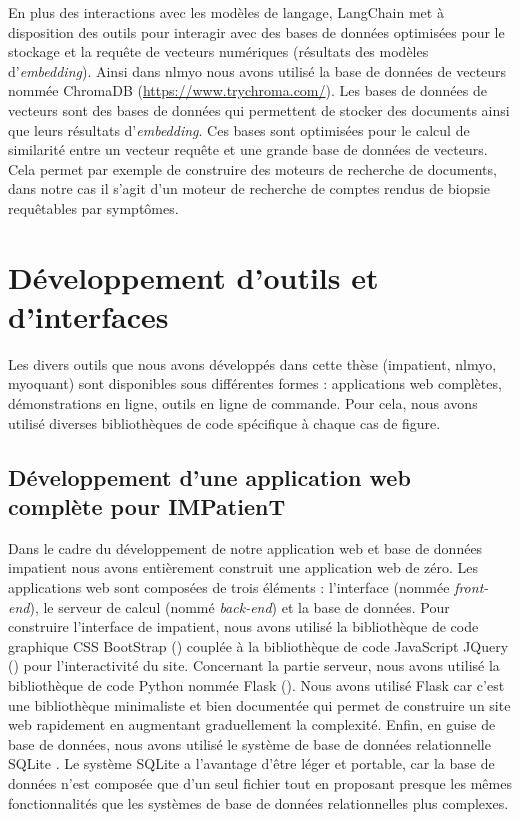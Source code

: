 En plus des interactions avec les modèles de langage, LangChain met à disposition des outils pour interagir avec des bases de données optimisées pour le stockage et la requête de vecteurs numériques (résultats des modèles d'\textit{embedding}). Ainsi dans \gls{nlmyo} nous avons utilisé la base de données de vecteurs nommée ChromaDB (\href{https://www.trychroma.com/}{https://www.trychroma.com/}). Les bases de données de vecteurs sont des bases de données qui permettent de stocker des documents ainsi que leurs résultats d'\textit{embedding}. Ces bases sont optimisées pour le calcul de similarité entre un vecteur requête et une grande base de données de vecteurs. Cela permet par exemple de construire des moteurs de recherche de documents, dans notre cas il s'agit d'un moteur de recherche de comptes rendus de biopsie requêtables par symptômes.

\section{Développement d'outils et d'interfaces}
Les divers outils que nous avons développés dans cette thèse (\gls{impatient}, \gls{nlmyo}, \gls{myoquant}) sont disponibles sous différentes formes : applications web complètes, démonstrations en ligne, outils en ligne de commande.  Pour cela, nous avons utilisé diverses bibliothèques de code spécifique à chaque cas de figure.

\subsection{Développement d'une application web complète pour IMPatienT}
Dans le cadre du développement de notre application web et base de données \gls{impatient} nous avons entièrement construit une application web de zéro. Les applications web sont composées de trois éléments : l'interface (nommée \textit{front-end}), le serveur de calcul (nommé \textit{back-end}) et la base de données. Pour construire l'interface de \gls{impatient}, nous avons utilisé la bibliothèque de code graphique CSS BootStrap (\cite{mark_otto_bootstrap_2011}) couplée à la bibliothèque de code JavaScript JQuery (\cite{resig_jquery_2006}) pour l'interactivité du site. Concernant la partie serveur, nous avons utilisé la bibliothèque de code Python nommée Flask (\cite{ronacher_flask_2010}).  Nous avons utilisé Flask car c'est une bibliothèque minimaliste et bien documentée qui permet de construire un site web rapidement en augmentant graduellement la complexité. Enfin, en guise de base de données, nous avons utilisé le système de base de données relationnelle SQLite \cite{hipp_sqlite_2020}. Le système SQLite a l'avantage d'être léger et portable, car la base de données n'est composée que d'un seul fichier tout en proposant presque les mêmes fonctionnalités que les systèmes de base de données relationnelles plus complexes.

